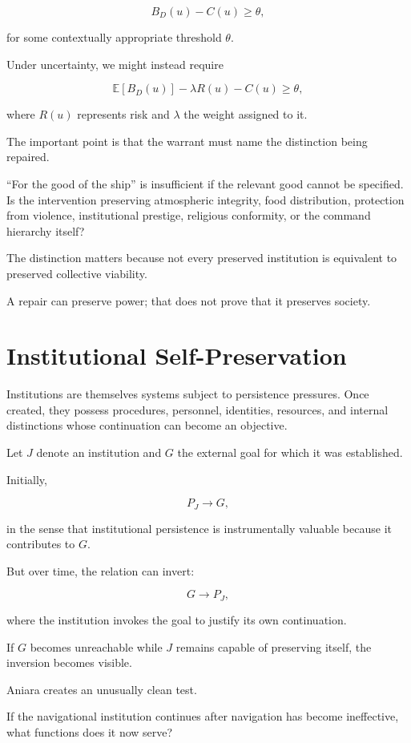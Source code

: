 \documentclass[11pt,oneside]{book}
\theoremstyle{definition}
\theoremstyle{remark}
\begin{document}
\[
B_D(u)-C(u)\geq\theta,
\]

for some contextually appropriate threshold \(\theta\).

Under uncertainty, we might instead require

\[
\mathbb E[B_D(u)]
-
\lambda R(u)
-
C(u)
\geq
\theta,
\]

where \(R(u)\) represents risk and \(\lambda\) the weight assigned to it.

The important point is that the warrant must name the distinction being repaired.

``For the good of the ship'' is insufficient if the relevant good cannot be specified. Is the intervention preserving atmospheric integrity, food distribution, protection from violence, institutional prestige, religious conformity, or the command hierarchy itself?

The distinction matters because not every preserved institution is equivalent to preserved collective viability.

A repair can preserve power; that does not prove that it preserves society.

\section{Institutional Self-Preservation}

Institutions are themselves systems subject to persistence pressures. Once created, they possess procedures, personnel, identities, resources, and internal distinctions whose continuation can become an objective.

Let \(J\) denote an institution and \(G\) the external goal for which it was established.

Initially,

\[
P_J
\rightarrow
G,
\]

in the sense that institutional persistence is instrumentally valuable because it contributes to \(G\).

But over time, the relation can invert:

\[
G
\rightarrow
P_J,
\]

where the institution invokes the goal to justify its own continuation.

If \(G\) becomes unreachable while \(J\) remains capable of preserving itself, the inversion becomes visible.

Aniara creates an unusually clean test.

If the navigational institution continues after navigation has become ineffective, what functions does it now serve?
\end{document}
